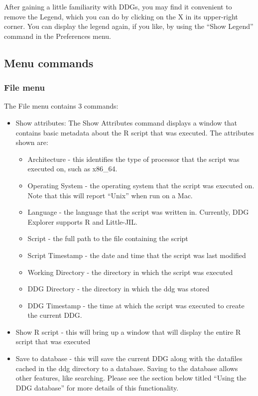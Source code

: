 \documentclass[12pt]{article}
\newcommand\liststyleWWviiiNumii{%
\renewcommand\labelitemi{•}
\renewcommand\labelitemii{•}
\renewcommand\labelitemiii{•}
\renewcommand\labelitemiv{•}
}
\begin{document}
{{\mdseries\upshape\color{black}
After gaining a little familiarity with DDGs, you may find it convenient to remove the Legend, which you can do by clicking on the X in its upper-right corner. You can display the legend again, if you like, by using the “Show Legend” command in the Preferences menu.}

\subsection{Menu commands}

\subsubsection{File menu}

{\mdseries\upshape\color{black}
The File menu contains 3 commands:}

\liststyleWWviiiNumii
\begin{itemize}
\item {\color{black}
Show attributes: The Show Attributes command displays a window that contains basic metadata about the R script that was executed. The attributes shown are:}

\begin{itemize}
\item {\color{black}
Architecture - this identifies the type of processor that the script was executed on, such as x86\_64.}
\item {\color{black}
Operating System - the operating system that the script was executed on. Note that this will report “Unix” when run on a Mac.}
\item {\color{black}
Language - the language that the script was written in. Currently, DDG Explorer supports R and Little-JIL.}
\item {\color{black}
Script - the full path to the file containing the script}
\item {\color{black}
Script Timestamp - the date and time that the script was last modified}
\item {\color{black}
Working Directory - the directory in which the script was executed}
\item {\color{black}
DDG Directory - the directory in which the ddg was stored}
\item {\color{black}
DDG Timestamp - the time at which the script was executed to create the current DDG.}
\end{itemize}
\item {\color{black}
Show R script - this will bring up a window that will display the entire R script that was executed}
\item {\color{black}
Save to database - this will save the current DDG along with the datafiles cached in the ddg directory to a database. Saving to the database allows other features, like searching. Please see the section below titled “Using the DDG database” for more details of this functionality.}
\end{itemize}
}
\end{document}
